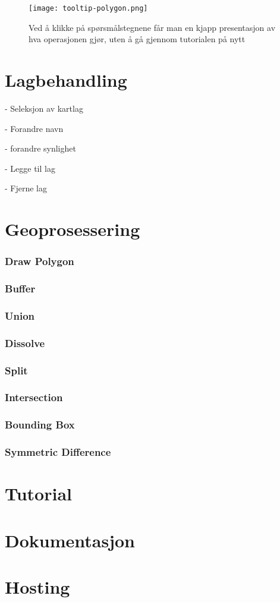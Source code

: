 \begin{figure}[h]
    \center
    \texttt{[image: tooltip-polygon.png]}
    \caption{Ved å klikke på spørsmålstegnene får man en kjapp presentasjon av hva operasjonen gjør, uten å gå gjennom tutorialen på nytt}
    \label{fig:tooltip}
\end{figure}

\section{Lagbehandling}
\label{sec:lagbehandling}

- Seleksjon av kartlag

- Forandre navn

- forandre synlighet

- Legge til lag

- Fjerne lag

\section{Geoprosessering}
\label{sec:geoprosessering}

\subsubsection{Draw Polygon}
\subsubsection{Buffer}
\subsubsection{Union}
\subsubsection{Dissolve}
\subsubsection{Split}
\subsubsection{Intersection}
\subsubsection{Bounding Box}
\subsubsection{Symmetric Difference}

\section{Tutorial}

\section{Dokumentasjon}

\section{Hosting}
\label{sec:hosting}
